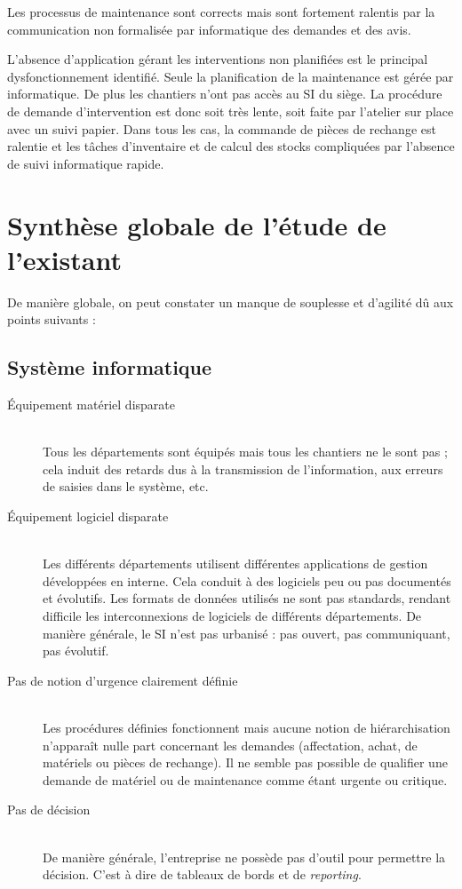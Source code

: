 \documentclass[twoside]{article}
\newcommand\el{\hfill\\}
\begin{document}
Les processus de maintenance sont corrects mais sont fortement ralentis par
la communication non formalisée par informatique des demandes et des avis.

L'absence d'application gérant les interventions non planifiées est le
principal dysfonctionnement identifié. Seule la planification de la
maintenance est gérée par informatique. De plus les chantiers n'ont pas
accès au SI du siège. La procédure de demande d'intervention est donc soit
très lente, soit faite par l'atelier sur place avec un suivi papier. Dans
tous les cas, la commande de pièces de rechange est ralentie et les tâches
d'inventaire et de calcul des stocks compliquées par l'absence de suivi
informatique rapide.

\vfil
\pagebreak


\section{Synthèse globale de l'étude de l'existant}

De manière globale, on peut constater un manque de souplesse et d'agilité dû
aux points suivants :

\subsection{Système informatique}

\begin{description}

\item[Équipement matériel disparate]\el
Tous les départements sont équipés mais tous les chantiers ne le sont pas ;
cela induit des retards dus à la transmission de l'information, aux erreurs
de saisies dans le système, etc.  

\item[Équipement logiciel disparate]\el
Les différents départements utilisent différentes applications de gestion
développées en interne. Cela conduit à des logiciels peu ou pas documentés
et évolutifs. Les formats de données utilisés ne sont pas standards,
rendant difficile les interconnexions de logiciels de différents
départements. De manière générale, le SI n'est pas urbanisé : pas ouvert,
pas communiquant, pas évolutif.

\item[Pas de notion d'urgence clairement définie]\el
Les procédures définies fonctionnent mais aucune notion de hiérarchisation
n'apparaît nulle part concernant les demandes (affectation, achat, de
matériels ou pièces de rechange).  Il ne semble pas possible de qualifier
une demande de matériel ou de maintenance comme étant urgente ou critique.

\item[Pas de décision]\el
De manière générale, l'entreprise ne possède pas d'outil pour permettre la 
décision. C'est à dire de tableaux de bords et de {\sl reporting}.

\end{description}
\end{document}
